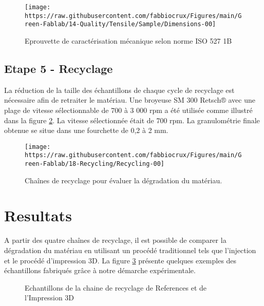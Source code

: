 \documentclass[
]{article}
\begin{document}
\begin{figure}

{\centering \texttt{[image: https://raw.githubusercontent.com/fabbiocrux/Figures/main/Green-Fablab/14-Quality/Tensile/Sample/Dimensions-00]} 

}

\caption{Eprouvette de caractérisation mécanique selon norme ISO 527 1B }\label{fig:mechanical-sample}
\end{figure}

\hypertarget{etape-5---recyclage}{%
\subsection{Etape 5 - Recyclage}\label{etape-5---recyclage}}

La réduction de la taille des échantillons de chaque cycle de recyclage est nécessaire afin de retraiter le matériau.
Une broyeuse SM 300 Retsch® avec une plage de vitesse sélectionnable de 700 à 3 000 rpm a été utilisée comme illustré dans la figure \ref{fig:broyeur}.
La vitesse sélectionnée était de 700 rpm.
La granulométrie finale obtenue se situe dans une fourchette de 0,2 à 2 mm.

\begin{figure}

{\centering \texttt{[image: https://raw.githubusercontent.com/fabbiocrux/Figures/main/Green-Fablab/18-Recycling/Recycling-00]} 

}

\caption{Chaînes de recyclage pour évaluer la dégradation du matériau.}\label{fig:broyeur}
\end{figure}

\hypertarget{resultats}{%
\section{Resultats}\label{resultats}}

A partir des quatre chaînes de recyclage, il est possible de comparer la dégradation du matériau en utilisant un procédé traditionnel tels que l'injection et le procédé d'impression 3D.
La figure \ref{fig:Samples} présente quelques exemples des échantillons fabriqués grâce à notre démarche expérimentale.

\begin{figure}

{\centering {}

}

\caption{Echantillons de la chaine de recyclage de References et de l'Impression 3D}\label{fig:Samples}
\end{figure}
\end{document}
